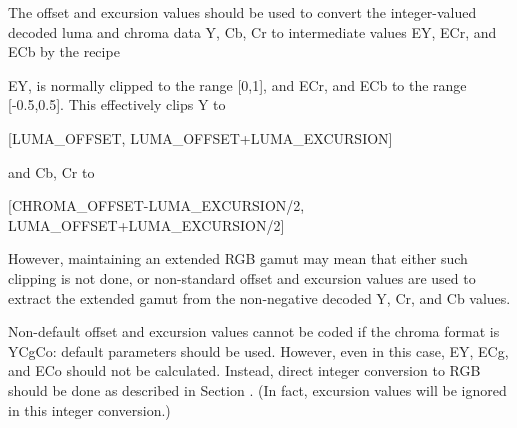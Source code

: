The offset and excursion values should be used to convert the
integer-valued decoded luma and chroma data Y, Cb, Cr to intermediate
values EY, ECr, and ECb by the recipe



EY, is normally clipped to the range [0,1], and ECr, and ECb to the
range [-0.5,0.5]. This effectively clips Y to 

[LUMA\_OFFSET, LUMA\_OFFSET+LUMA\_EXCURSION]

and Cb, Cr to

[CHROMA\_OFFSET-LUMA\_EXCURSION/2, LUMA\_OFFSET+LUMA\_EXCURSION/2]

However, maintaining an extended RGB gamut may mean that either such
clipping is not done, or non-standard offset and excursion values are
used to extract the extended gamut from the non-negative decoded Y, Cr,
and Cb values.

Non-default offset and excursion values cannot be coded if the chroma
format is YCgCo: default parameters should be used. However, even in
this case, EY, ECg, and ECo should not be calculated. Instead, direct
integer conversion to RGB should be done as described in Section . (In
fact, excursion values will be ignored in this integer conversion.)

